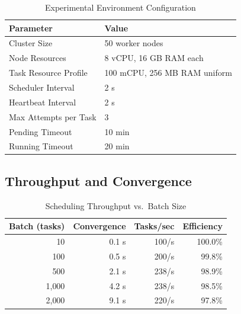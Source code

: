 \documentclass[11pt,a4paper]{article}
\begin{document}
\begin{table}[H]
\centering
\caption{Experimental Environment Configuration}
\label{tab:env}
\begin{tabular}{@{} l l @{}}
\toprule
\textbf{Parameter}     & \textbf{Value} \\
\midrule
Cluster Size           & 50 worker nodes \\
Node Resources         & 8 vCPU, 16 GB RAM each \\
Task Resource Profile  & 100 mCPU, 256 MB RAM uniform \\
Scheduler Interval     & 2 s \\
Heartbeat Interval     & 2 s \\
Max Attempts per Task  & 3 \\
Pending Timeout        & 10 min \\
Running Timeout        & 20 min \\
\bottomrule
\end{tabular}
\end{table}

\subsection{Throughput and Convergence}

\begin{table}[H]
\centering
\caption{Scheduling Throughput vs.\ Batch Size}
\label{tab:throughput}
\begin{tabular}{@{} r r r r @{}}
\toprule
\textbf{Batch (tasks)} & \textbf{Convergence} & \textbf{Tasks/sec} & \textbf{Efficiency} \\
\midrule
10       & 0.1 s   & 100/s  & 100.0\% \\
100      & 0.5 s   & 200/s  & 99.8\%  \\
500      & 2.1 s   & 238/s  & 98.9\%  \\
1{,}000  & 4.2 s   & 238/s  & 98.5\%  \\
2{,}000  & 9.1 s   & 220/s  & 97.8\%  \\
\bottomrule
\end{tabular}
\end{table}
\end{document}
